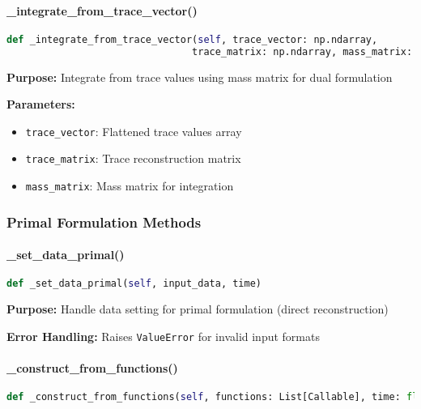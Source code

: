 \paragraph{\_integrate\_from\_trace\_vector()}\leavevmode
\begin{lstlisting}[language=Python, caption=Trace Integration Method]
def _integrate_from_trace_vector(self, trace_vector: np.ndarray, 
                                trace_matrix: np.ndarray, mass_matrix: np.ndarray)
\end{lstlisting}

\textbf{Purpose:} Integrate from trace values using mass matrix for dual formulation

\textbf{Parameters:}
\begin{itemize}
    \item \texttt{trace\_vector}: Flattened trace values array
    \item \texttt{trace\_matrix}: Trace reconstruction matrix
    \item \texttt{mass\_matrix}: Mass matrix for integration
\end{itemize}

\subsubsection{Primal Formulation Methods}

\paragraph{\_set\_data\_primal()}\leavevmode
\begin{lstlisting}[language=Python, caption=Primal Data Setting Method]
def _set_data_primal(self, input_data, time)
\end{lstlisting}

\textbf{Purpose:} Handle data setting for primal formulation (direct reconstruction)

\textbf{Error Handling:} Raises \texttt{ValueError} for invalid input formats

\paragraph{\_construct\_from\_functions()}\leavevmode
\begin{lstlisting}[language=Python, caption=Function Construction Method]
def _construct_from_functions(self, functions: List[Callable], time: float)
\end{lstlisting}


